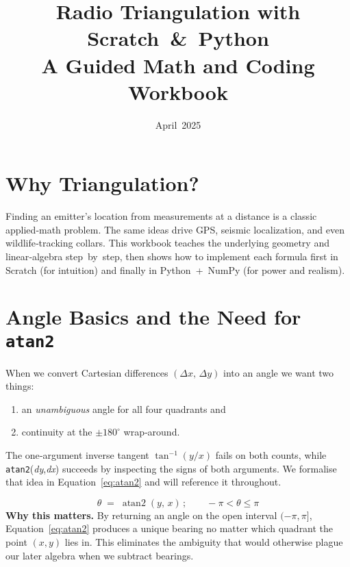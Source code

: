 \documentclass[11pt]{article}
\title{Radio Triangulation with Scratch~\&~Python\\\large A Guided Math and Coding Workbook}
\date{April 2025}
\begin{document}
\maketitle

\tableofcontents

\section{Why Triangulation?}
Finding an emitter’s location from measurements at a distance is a classic applied‑math problem.  The same ideas drive GPS, seismic localization, and even wildlife‑tracking collars.  This workbook teaches the underlying geometry and linear‑algebra step by step, then shows how to implement each formula first in Scratch (for intuition) and finally in Python + NumPy (for power and realism).

\section{Angle Basics and the Need for \texttt{atan2}}
When we convert Cartesian differences $(\Delta x,\,\Delta y)$ into an angle we want two things:
\begin{enumerate}
  \item an \emph{unambiguous} angle for all four quadrants and  
  \item continuity at the $\pm180^\circ$ wrap‑around.
\end{enumerate}
The one‑argument inverse tangent $\tan^{-1}(y/x)$ fails on both counts, while \texttt{atan2}(\textit{dy},\textit{dx}) succeeds by inspecting the signs of both arguments.  We formalise that idea in Equation~\eqref{eq:atan2} and will reference it throughout.

\begin{equation}
  \theta\;=\;\operatorname{atan2}(y,\,x)\,; \qquad -\pi < \theta \le \pi
  \label{eq:atan2}
\end{equation}
\noindent\textbf{Why this matters.}  By returning an angle on the open interval $(-\pi,\pi]$, Equation~\eqref{eq:atan2} produces a unique bearing no matter which quadrant the point $(x,y)$ lies in.  This eliminates the ambiguity that would otherwise plague our later algebra when we subtract bearings.
\end{document}
